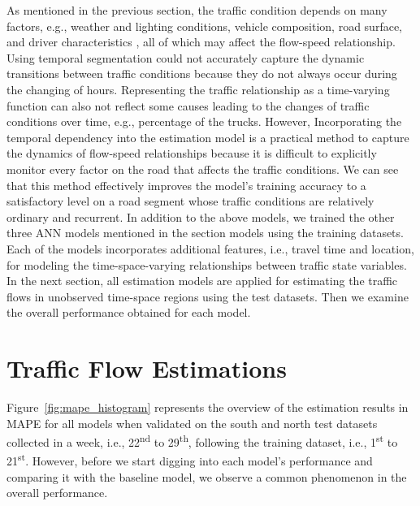 \documentclass[english]{kththesis}
\begin{document}
As mentioned in the previous section, the traffic condition depends on many factors, e.g., weather and lighting conditions, vehicle composition, road surface, and driver characteristics \cite{seo_tse, wang_tse_online_calibration}, all of which may affect the flow-speed relationship. Using temporal segmentation could not accurately capture the dynamic transitions between traffic conditions because they do not always occur during the changing of hours. Representing the traffic relationship as a time-varying function can also not reflect some causes leading to the changes of traffic conditions over time, e.g., percentage of the trucks. However, Incorporating the temporal dependency into the estimation model is a practical method to capture the dynamics of flow-speed relationships because it is difficult to explicitly monitor every factor on the road that affects the traffic conditions. We can see that this method effectively improves the model's training accuracy to a satisfactory level on a road segment whose traffic conditions are relatively ordinary and recurrent. In addition to the above models, we trained the other three ANN models mentioned in the section models using the training datasets. Each of the models incorporates additional features, i.e., travel time and location, for modeling the time-space-varying relationships between traffic state variables. In the next section, all estimation models are applied for estimating the traffic flows in unobserved time-space regions using the test datasets. Then we examine the overall performance obtained for each model.

\section{Traffic Flow Estimations}
\label{sec:trafficFlowEstimations}

Figure~\ref{fig:mape_histogram} represents the overview of the estimation results in MAPE for all models when validated on the south and north test datasets collected in a week, i.e., 22\textsuperscript{nd} to 29\textsuperscript{th}, following the training dataset, i.e., 1\textsuperscript{st} to 21\textsuperscript{st}. However, before we start digging into each model's performance and comparing it with the baseline model, we observe a common phenomenon in the overall performance. 
\end{document}

